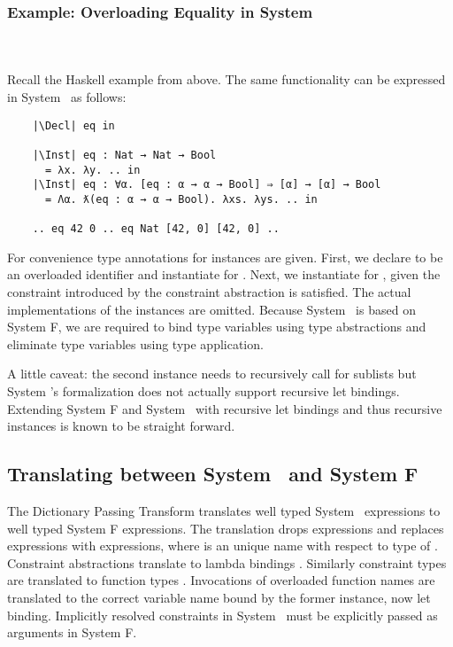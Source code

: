 \subsubsection{Example: Overloading Equality in System \Fo}\hfill\\\\
Recall the Haskell example from above. The same functionality can be expressed in System \Fo\ as follows: 
\begin{verbatim}
    |\Decl| eq in

    |\Inst| eq : Nat → Nat → Bool 
      = λx. λy. .. in
    |\Inst| eq : ∀α. [eq : α → α → Bool] ⇒ [α] → [α] → Bool 
      = Λα. ƛ(eq : α → α → Bool). λxs. λys. .. in

    .. eq 42 0 .. eq Nat [42, 0] [42, 0] .. 
\end{verbatim}
For convenience type annotations for instances are given. 
First, we declare  to be an overloaded identifier and instantiate  for . 
Next, we instantiate  for \inl{[α]}, given the constraint introduced by the constraint abstraction  is satisfied.  
The actual implementations of the instances are omitted.
Because System \Fo\ is based on System F, we are required to bind type variables using type abstractions  and eliminate type variables using type application. 

\noindent A little caveat: the second instance needs to recursively call  for sublists but System \Fo's formalization does not actually support recursive let bindings. Extending System F and System \Fo\ with recursive let bindings and thus recursive instances is known to be straight forward. 

\subsection{Translating between System \Fo\ and System F}
The Dictionary Passing Transform translates well typed System \Fo\ expressions to well typed System F expressions. 
The translation drops  expressions and replaces  expressions with  expressions, where  is an unique name with respect to type  of . 
Constraint abstractions  translate to lambda bindings . 
Similarly constraint types  are translated to function types . 
Invocations of overloaded function names are translated to the correct variable name bound by the former instance, now let binding.
Implicitly resolved constraints in System \Fo\ must be explicitly passed as arguments in System F.

